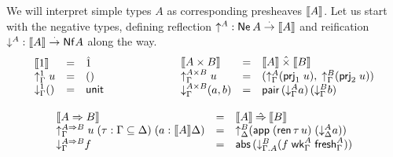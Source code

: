 \documentclass[a4paper,USenglish,cleveref, autoref]{lipics-v2019}
\begin{document}
We will interpret simple types $A$ as corresponding presheaves
$\mathopen{{[\kern-0.14em[}} A \mathclose{{]\kern-0.14em]}}$.  Let us start with the negative types, defining
reflection $\mathord{\uparrow_{}^{A}} : \mathsf{Ne}^{}\, A \stackrel{\cdot}{\to} \mathopen{{[\kern-0.14em[}} A \mathclose{{]\kern-0.14em]}}$
and reification $\mathord{\downarrow_{}^{A}} : \mathopen{{[\kern-0.14em[}} A \mathclose{{]\kern-0.14em]}} \stackrel{\cdot}{\to} \mathsf{Nf} A$ along the way.
\begin{gather*}
\begin{array}{lcl}
  \den   \tyone          & = & \hatone \\
  \upG   \tyone \; u     & = & \ttempty \\
  \downG \tyone \ttempty & = & \tunit \\
\end{array}
\qquad\qquad\qquad
\begin{array}{lcl}
  \den   {A \times B}       & = & \den A \hattimes \den B \\
  \upG   {A \times B} \; u  & = & (\upG A (\prj1 u),\;\upG B (\prj2 u)) \\
  \downG {A \times B} (a,b) & = & \tpair\,(\downG A a)\,(\downG B b) \\
\end{array}
\\[2ex]
\begin{array}{lcl}
  \den {A \To B}    & = & \den A \hatto \den B \\
  \upG   {A \To B}    \; u \; (\tau : \Gamma \sublist \Delta) \; (a : \den A \Delta)
     & = & \up[\Delta] B (\tapp\;(\tren\,\tau\, u)\;(\down[\Delta] A a)) \\
  \downG {A \To B}    f        & = & \tabs\,(\down[\cext \Gamma A] B
    (f\;\twk^A_\Gamma\;\tfresh^A_\Gamma))
\end{array}
\end{gather*}
\end{document}
